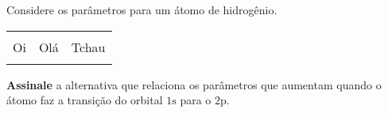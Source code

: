 Considere os parâmetros para um átomo de hidrogênio.

\begin{tabular}{lrc}

\toprule\\

Oi & Olá & Tchau \\

\midrule\\

\bottomrule

\end{tabular}

\textbf{Assinale} a alternativa que relaciona os parâmetros que aumentam quando o átomo faz a transição do orbital \(\mathrm{1s}\) para o
\(\mathrm{2p}\).